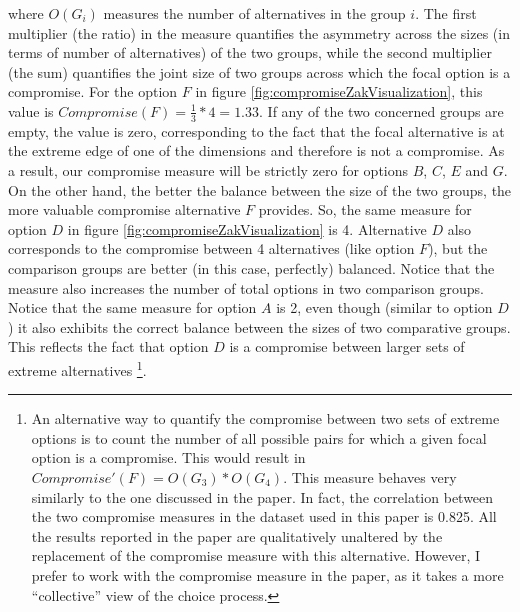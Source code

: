 \documentclass[a4paper,12pt]{article}
\begin{document}
where $O(G_i)$ measures the number of alternatives in the group $i$. The first multiplier (the ratio) in the measure quantifies the asymmetry across the sizes (in terms of number of alternatives) of the two groups, while the second multiplier (the sum) quantifies the joint size of two groups across which the focal option is a compromise. For the option $F$ in figure \ref{fig:compromiseZakVisualization}, this value is $Compromise(F) = \frac{1}{3} * 4 = 1.33$. If any of the two concerned groups are empty, the value is zero, corresponding to the fact that the focal alternative is at the extreme edge of one of the dimensions and therefore is not a compromise. As a result, our compromise measure will be strictly zero for options $B$, $C$, $E$ and $G$. On the other hand, the better the balance between the size of the two groups, the more valuable compromise alternative $F$ provides. So, the same measure for option $D$ in figure \ref{fig:compromiseZakVisualization} is 4. Alternative $D$ also corresponds to the compromise between 4 alternatives (like option $F$), but the comparison groups are better (in this case, perfectly) balanced. Notice that the measure also increases the number of total options in two comparison groups. Notice that the same measure for option $A$ is 2, even though (similar to option $D$) it also exhibits the correct balance between the sizes of two comparative groups. This reflects the fact that option $D$ is a compromise between larger sets of extreme alternatives \footnote{An alternative way to quantify the compromise between two sets of extreme options is to count the number of all possible pairs for which a given focal option is a compromise. This would result in $Compromise'(F) = O(G_3) * O(G_4)$. This measure behaves very similarly to the one discussed in the paper. In fact, the correlation between the two compromise measures in the dataset used in this paper is 0.825. All the results reported in the paper are qualitatively unaltered by the replacement of the compromise measure with this alternative. However, I prefer to work with the compromise measure in the paper, as it takes a more ``collective'' view of the choice process.}. 
\end{document}
